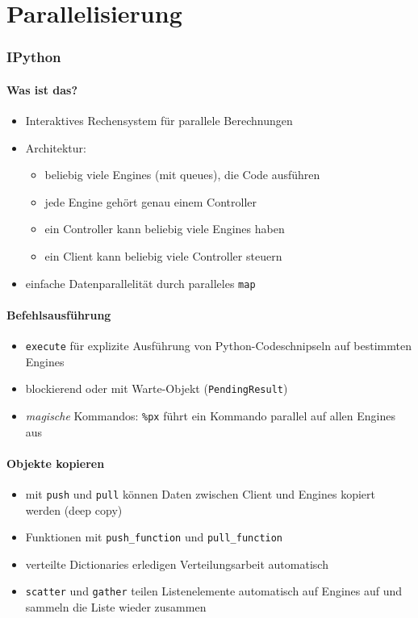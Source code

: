 \documentclass[a4paper, 12pt]{article}
\begin{document}
\part{Parallelisierung}



\section{IPython}


\subsection{Was ist das?}
\begin{itemize}
  \item Interaktives Rechensystem für parallele Berechnungen
  \item Architektur:
    \begin{itemize}
      \item beliebig viele Engines (mit queues), die Code ausführen
      \item jede Engine gehört genau einem Controller
      \item ein Controller kann beliebig viele Engines haben
      \item ein Client kann beliebig viele Controller steuern
    \end{itemize}
  \item einfache Datenparallelität durch paralleles \texttt{map}
\end{itemize}


\subsection{Befehlsausführung}
\begin{itemize}
  \item \texttt{execute} für explizite Ausführung von Python-Codeschnipseln auf bestimmten Engines
  \item blockierend oder mit Warte-Objekt (\texttt{PendingResult})
  \item \emph{magische} Kommandos: \texttt{\%px} führt ein Kommando parallel auf allen Engines aus
\end{itemize}

\subsection{Objekte kopieren}
\begin{itemize}
  \item mit \texttt{push} und \texttt{pull} können Daten zwischen Client und Engines kopiert werden (deep copy)
  \item Funktionen mit \texttt{push\_function} und \texttt{pull\_function}
  \item verteilte Dictionaries erledigen Verteilungsarbeit automatisch
  \item \texttt{scatter} und \texttt{gather} teilen Listenelemente automatisch auf Engines auf und sammeln die Liste wieder zusammen
\end{itemize}
\end{document}
